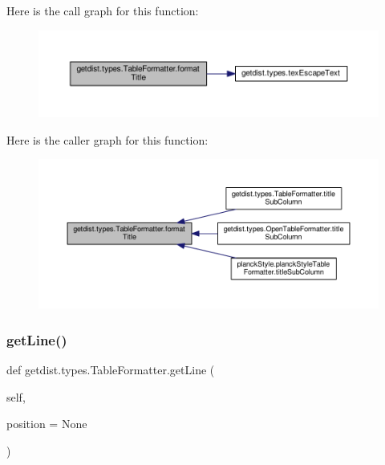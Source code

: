 Here is the call graph for this function\+:
\nopagebreak
\begin{figure}[H]
\begin{center}
\leavevmode
\includegraphics[width=350pt]{classgetdist_1_1types_1_1TableFormatter_ab69b39cc3ea77c19e14235dee84964a4_cgraph}
\end{center}
\end{figure}
Here is the caller graph for this function\+:
\nopagebreak
\begin{figure}[H]
\begin{center}
\leavevmode
\includegraphics[width=350pt]{classgetdist_1_1types_1_1TableFormatter_ab69b39cc3ea77c19e14235dee84964a4_icgraph}
\end{center}
\end{figure}
\mbox{\label{classgetdist_1_1types_1_1TableFormatter_a04b0d85ebf578c2a6b3da0661fd796c5}} 
\subsubsection{\texorpdfstring{get\+Line()}{getLine()}}
{\footnotesize\ttfamily def getdist.\+types.\+Table\+Formatter.\+get\+Line (\begin{DoxyParamCaption}\item[{}]{self,  }\item[{}]{position = {\ttfamily None} }\end{DoxyParamCaption})}




